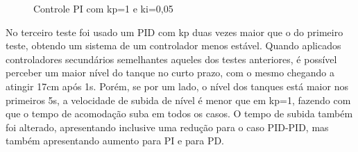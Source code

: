 \documentclass[a4paper,12pt]{article}
\begin{document}
\begin{figure}[H]
\hspace{1cm}
     \caption{Controle PI com kp=1 e ki=0,05}
     \label{fig:ControlePI}
\end{figure}



No terceiro teste foi usado um PID com kp duas vezes maior que o do primeiro teste, obtendo um sistema de um controlador menos estável. Quando aplicados controladores secundários semelhantes aqueles dos testes anteriores, é possível perceber um maior nível do tanque no curto prazo, com o mesmo chegando a atingir 17cm após 1s. Porém, se por um lado, o nível dos tanques está maior nos primeiros 5s, a velocidade de subida de nível é menor que em kp=1, fazendo com que o tempo de acomodação suba em todos os casos. O tempo de subida também foi alterado, apresentando inclusive uma redução para o caso PID-PID, mas também apresentando aumento para PI e para PD.

\end{document}
